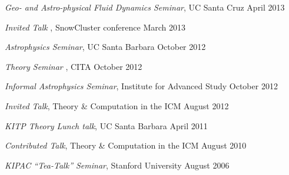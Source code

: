 \begin{talkenum}
\item \textit{Geo- and Astro-physical Fluid Dynamics Seminar}, UC Santa Cruz  \hspace*{\fill} April 2013

\item \textit{Invited Talk }, SnowCluster conference \hspace*{\fill} March 2013

\item \textit{Astrophysics Seminar}, UC Santa Barbara \hspace*{\fill} October 2012

\item \textit{Theory Seminar }, CITA  \hspace*{\fill} October 2012

\item \textit{Informal Astrophysics Seminar}, Institute for Advanced Study \hspace*{\fill} October 2012

\item \textit{Invited Talk}, Theory \& Computation in the ICM \hspace*{\fill} August 2012

\item \textit{KITP Theory Lunch talk}, UC Santa Barbara \hspace*{\fill} April 2011

\item \textit{Contributed Talk}, Theory \& Computation in the ICM \hspace*{\fill} August 2010

\item \textit{KIPAC “Tea-Talk” Seminar}, Stanford University \hspace*{\fill} August 2006

\end{talkenum}

